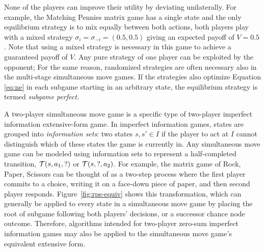 None of the players can improve their utility by deviating unilaterally.
For example, the Matching Pennies matrix game has a single state and the only equilibrium strategy is to mix equally between
both actions, \ie both players play with a mixed strategy $\sigma_i = \sigma_{-i} = (0.5, 0.5)$ giving an expected payoff of
$V = 0.5$.
Note that using a mixed strategy is necessary in this game to achieve a guaranteed payoff of $V$.
Any pure strategy of one player can be exploited by the opponent; 
For the same reason, randomized strategies are often necessary also in the multi-stage simultaneous move games.
If the strategies also optimize Equation \ref{eq:ne} in each subgame starting in an arbitrary state, the equilibrium strategy
is termed {\it subgame perfect.}

A two-player simultaneous move game is a specific type of two-player imperfect information extensive-form game.
In imperfect information
games, states are grouped into {\it information sets}: two states $s, s' \in I$ if the player
to act at $I$ cannot distinguish which of these states the game is currently in. Any simultaneous move game can be modeled
using information sets to represent a half-completed transition, \ie $\mathcal{T}(s, a_1, ?)$ or $\mathcal{T}(s, ?, a_2)$.
For example, the matrix game of Rock, Paper, Scissors can be thought of as a two-step process where the first player commits
to a choice, writing it on a face-down piece of paper, and then second player responds. Figure~\ref{fig:rps-equiv} shows this
transformation, which can generally be applied to every state in a simultaneous move game by placing the root of subgame following
both players' decisions, or a successor chance node outcome.
Therefore, algorithms intended for two-player zero-sum imperfect information games may also be applied to the
simultaneous move game's equivalent extensive form.

